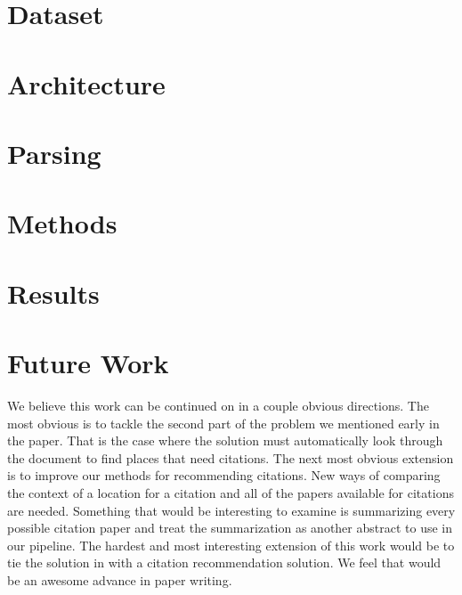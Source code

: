 \documentclass[10pt, conference, compsocconf]{IEEEtran}
\begin{document}
\section{Dataset}\label{sec:dataset}

\section{Architecture}\label{sec:architecture}

\section{Parsing}\label{sec:parsing}

\section{Methods}\label{sec:methods}

\section{Results}\label{sec:results}

\section{Future Work}\label{sec:future}
We believe this work can be continued on in a couple obvious directions. The most obvious is to tackle the second part of the problem we mentioned early in the paper. That is the case where the solution must automatically look through the document to find places that need citations. The next most obvious extension is to improve our methods for recommending citations. New ways of comparing the context of a location for a citation and all of the papers available for citations are needed. Something that would be interesting to examine is summarizing every possible citation paper and treat the summarization as another abstract to use in our pipeline. The hardest and most interesting extension
of this work would be to tie the solution in with a citation recommendation solution. We feel that would be an awesome advance in paper writing.
\end{document}
